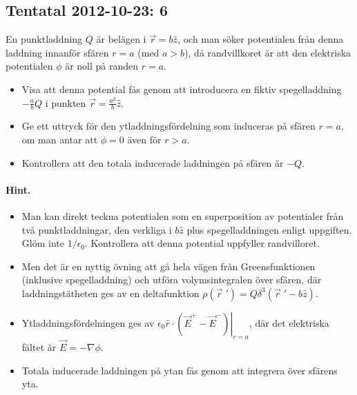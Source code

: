 \documentclass[%
oneside,                 %
final,                   %
10pt]{article}
\newenvironment{doconceexercise}{}{}
\newcounter{doconceexercisecounter}
\begin{document}
\begin{doconceexercise}

\subsection{Tentatal 2012-10-23: 6}

En punktladdning $Q$ är belägen i $\vec{r} = b\hat{z}$, och man söker potentialen från denna laddning innanför sfären $r = a$ (med $a > b$), då randvillkoret är att den elektriska potentialen $\phi$ är noll på randen $r = a$. 
\begin{itemize}
\item Visa att denna potential fås genom att introducera en fiktiv spegelladdning $−\frac{a}{b}Q$ i punkten $\vec{r} = \frac{a^2}{b} \hat{z}$. 

\item Ge ett uttryck för den ytladdningsfördelning som induceras på sfären $r = a$, om man antar att $\phi = 0$ även för $r > a$. 

\item Kontrollera att den totala inducerade laddningen på sfären är $−Q$.
\end{itemize}

\noindent

\paragraph{Hint.}
\begin{itemize}
\item Man kan direkt teckna potentialen som en superposition av potentialer från två punktladdningar, den verkliga i $b\hat{z}$ plus spegelladdningen enligt uppgiften. Glöm inte $1/\epsilon_0$. Kontrollera att denna potential uppfyller randvilloret.

\item Men det är en nyttig övning att gå hela vägen från Greensfunktionen (inklusive spegelladdning) och utföra volymsintegralen över sfären, där laddningstätheten ges av en deltafunktion $\rho(\vec{r}{\;}') = Q \delta^3(\vec{r}{\;}' - b\hat{z})$.

\item Ytladdningsfördelningen ges av $\epsilon_0 \left. \hat{r} \cdot \left( \vec{E}^+ - \vec{E}^- \right)  \right|_{r=a}$, där det elektriska fältet är $\vec{E} = - \nabla \phi$.

\item Totala inducerade laddningen på ytan fås genom att integrera över sfärens yta.
\end{itemize}


\end{doconceexercise}
\end{document}
